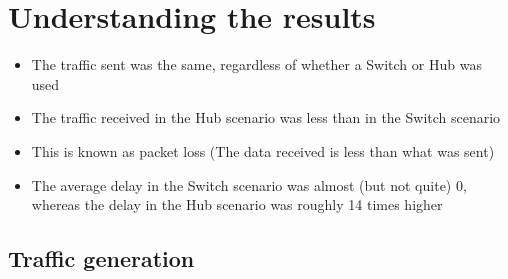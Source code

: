 
\section*{Understanding the results}

\begin{itemize}
  \item The traffic sent was the same, regardless of whether a Switch or Hub was used
  \item The traffic received in the Hub scenario was less than in the Switch scenario
  \item This is known as packet loss (The data received is less than what was sent)
  \item The average delay in the Switch scenario was almost (but not quite) 0, whereas the delay in the Hub scenario was roughly 14 times higher
\end{itemize}

\subsection*{Traffic generation}

